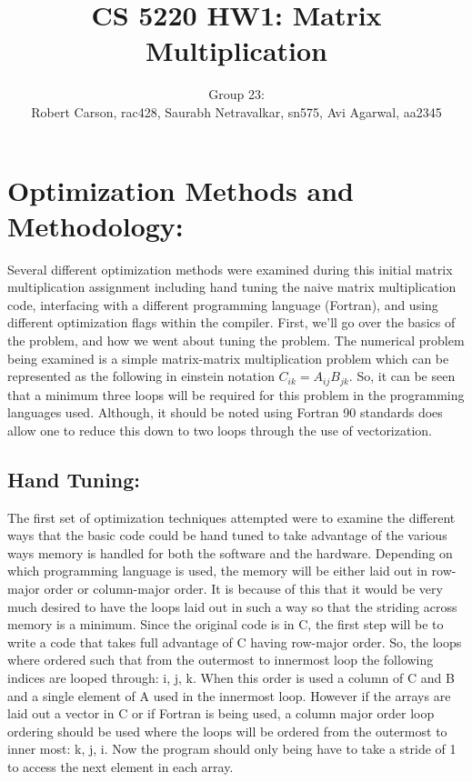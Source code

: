 \documentclass{article}
\begin{document}
\title{CS 5220 HW1: Matrix Multiplication}
\author{Group 23: \\Robert Carson, rac428, Saurabh Netravalkar, sn575, Avi Agarwal, aa2345}
\renewcommand{\today}{17 Sept. 2015}
\maketitle

\section*{Optimization Methods and Methodology:} 

Several different optimization methods were examined during this initial matrix multiplication assignment including hand tuning the naive matrix multiplication code, interfacing with a different programming language (Fortran), and using different optimization flags within the compiler.  First, we'll go over the basics of the problem, and how we went about tuning the problem. The numerical problem being examined is a simple matrix-matrix multiplication problem which can be represented as the following in einstein notation  $C_{ik} = A_{ij}B_{jk}$. 
So, it can be seen that a minimum three loops will be required for this problem in the programming languages used. Although, it should be noted using Fortran 90 standards does allow one to reduce this down to two loops through the use of vectorization. 

\subsection*{Hand Tuning:}

The first set of optimization techniques attempted were to examine the different ways that the basic code could be hand tuned to take advantage of the various ways memory is handled for both the software and the hardware.  Depending on which programming language is used, the memory will be either laid out in row-major order or column-major order. It is because of this that it would be very much desired to have the loops laid out in such a way so that the striding across memory is a minimum. Since the original code is in C, the first step will be to write a code that takes full advantage of C having row-major order. So, the loops where ordered such that from the outermost to innermost loop the following indices are looped through: i, j, k. When this order is used a column of C and B and a single element of A used in the innermost loop. However if the arrays are laid out a vector in C or if Fortran is being used, a column major order loop ordering should be used where the loops will be ordered from the outermost to inner most: k, j, i. Now the program should only being have to take a stride of 1 to access the next element in each array.
\end{document}
